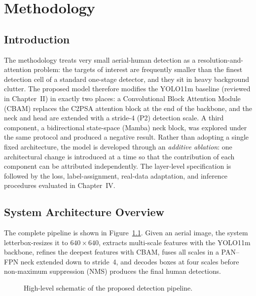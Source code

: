 \chapter{Methodology}

\section{Introduction}
The methodology treats very small aerial-human detection as a
resolution-and-attention problem: the targets of
interest are frequently smaller than the finest detection cell of a standard
one-stage detector, and they sit in heavy background clutter. The proposed model
therefore modifies the YOLO11m baseline (reviewed in Chapter~II) in exactly two
places: a Convolutional Block Attention Module (CBAM) replaces the C2PSA attention
block at the end of the backbone, and the neck and head are extended with a
stride-4 (P2) detection scale. A third component, a bidirectional state-space
(Mamba) neck block, was explored under the same protocol and produced a negative
result. Rather than adopting a single fixed architecture, the model
is developed through an \emph{additive ablation}: one architectural change is
introduced at a time so that the contribution of each component can be attributed
independently. The layer-level specification is followed by the loss,
label-assignment, real-data adaptation, and inference procedures evaluated in
Chapter~IV.

\section{System Architecture Overview}
The complete pipeline is shown in Figure~\ref{fig:framework}. Given an aerial
image, the system letterbox-resizes it to $640 \times 640$, extracts multi-scale
features with the YOLO11m backbone, refines the deepest features with CBAM,
fuses all scales in a PAN--FPN neck extended down to stride~4, and decodes boxes
at four scales before non-maximum suppression (NMS) produces the final human
detections.

\begin{figure}[tbp]
  \centering
  
  \caption{High-level schematic of the proposed detection pipeline.}
  \label{fig:framework}
\end{figure}

